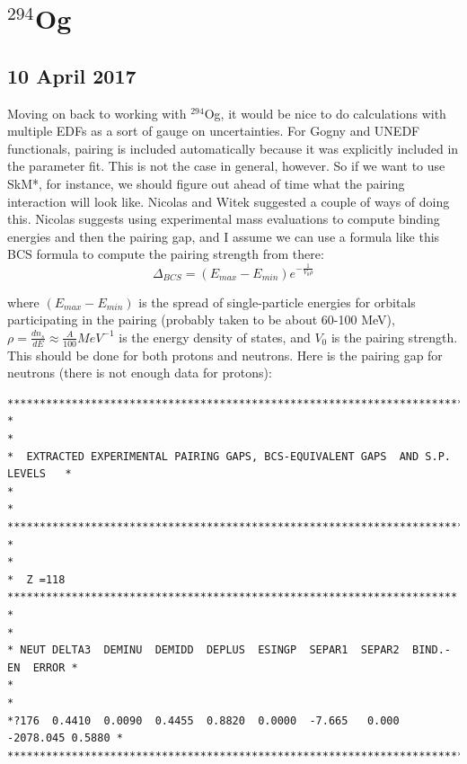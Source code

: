 \documentclass[]{report}
\begin{document}
\section*{$^{294}$Og}
\subsection*{10 April 2017}
Moving on back to working with $^{294}$Og, it would be nice to do calculations with multiple EDFs as a sort of gauge on uncertainties. For Gogny and UNEDF functionals, pairing is included automatically because it was explicitly included in the parameter fit. This is not the case in general, however. So if we want to use SkM*, for instance, we should figure out ahead of time what the pairing interaction will look like. Nicolas and Witek suggested a couple of ways of doing this. Nicolas suggests using experimental mass evaluations to compute binding energies and then the pairing gap, and I assume we can use a formula like this BCS formula to compute the pairing strength from there:
\begin{equation}
\Delta_{BCS} = (E_{max}-E_{min})e^{-\frac{1}{V_0\rho}}
\end{equation}

\noindent where $(E_{max}-E_{min})$ is the spread of single-particle energies for orbitals participating in the pairing (probably taken to be about 60-100 MeV), $\rho = \frac{dn_s}{dE} \approx \frac{A}{100} MeV^{-1}$ is the energy density of states, and $V_0$ is the pairing strength. This should be done for both protons and neutrons. Here is the pairing gap for neutrons (there is not enough data for protons):

\begin{verbatim}
********************************************************************************
*                                                                              *
*  EXTRACTED EXPERIMENTAL PAIRING GAPS, BCS-EQUIVALENT GAPS  AND S.P. LEVELS   *
*                                                                              *
********************************************************************************
*                                                                              *
*  Z =118 **********************************************************************
*                                                                              *
* NEUT DELTA3  DEMINU  DEMIDD  DEPLUS  ESINGP  SEPAR1  SEPAR2  BIND.-EN  ERROR *
*                                                                              *
*?176  0.4410  0.0090  0.4455  0.8820  0.0000  -7.665   0.000 -2078.045 0.5880 *
********************************************************************************
\end{verbatim}
\end{document}
